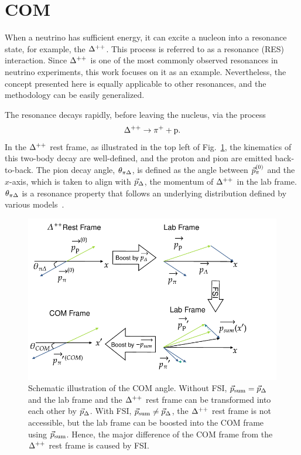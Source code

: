 \section{COM}
\label{sec:mc-com}
When a neutrino has sufficient energy, it can excite a nucleon into a resonance state, for example, the $\Delta^{++}$. 
This process is referred to as a resonance (RES) interaction.
Since $\Delta^{++}$ is one of the most commonly observed resonances in neutrino experiments, this work focuses on it as an example.
Nevertheless, the concept presented here is equally applicable to other resonances, and the methodology can be easily generalized.

The resonance decays rapidly, before leaving the nucleus, via the process
\begin{equation}
     \Delta^{++} \rightarrow \pi^+ + \textrm{p}.
\end{equation}
In the $\Delta^{++}$ rest frame, as illustrated in the top left of Fig.~\ref{fig:COM-diagram}, the kinematics of this two-body decay are well-defined, and the proton and pion are emitted back-to-back.
The pion decay angle, $\theta_{\pi\Delta}$, is defined as the angle between $\vec{p}_{\pi}^{(0)}$ and the $x$-axis, which is taken to align with $\vec{p}_{\Delta}$, the momentum of $\Delta^{++}$ in the lab frame. 
$\theta_{\pi\Delta}$ is a resonance property that follows an underlying distribution defined by various models~\cite{Rein:1987cb,Kabirnezhad:2017jmf,Kabirnezhad:2020wtp,Kabirnezhad:2022znc}.

\begin{figure}[ht!]
\centering
\includegraphics[width=\linewidth]{figures/COM/COM-diagram.pdf}
\caption{Schematic illustration of the COM angle. Without FSI, $\vec{p}_{\textrm{sum}}=\vec{p}_{\Delta}$ and the lab frame and the $\Delta^{++}$ rest frame can be transformed into each other by $\vec{p}_{\Delta}$. With FSI, $\vec{p}_{\textrm{sum}} \neq \vec{p}_{\Delta}$, the $\Delta^{++}$ rest frame is not accessible, but the lab frame can be boosted into the COM frame using $\vec{p}_{\textrm{sum}}$. Hence, the major difference of the COM frame from the $\Delta^{++}$ rest frame is caused by FSI.}
\label{fig:COM-diagram}
\end{figure}

